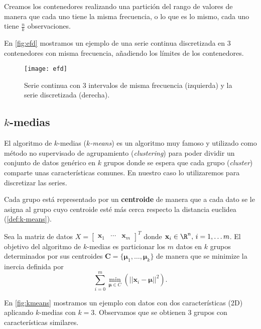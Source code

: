 Creamos los contenedores realizando una partición del rango de valores de manera que cada uno tiene la misma frecuencia, o lo que es lo mismo, cada uno tiene $\frac{n}{k}$ observaciones.

En \autoref{fig:efd} mostramos un ejemplo de una serie continua discretizada en 3 contenedores con misma frecuencia, añadiendo los límites de los contenedores.

\begin{figure}[htpb]
  \centering
  \texttt{[image: efd]}
  \caption{Serie continua con 3 intervalos de misma frecuencia (izquierda) y la serie discretizada (derecha).}
  \label{fig:efd}
\end{figure}

\subsection{$k$-medias}

El algoritmo de $k$-medias (\emph{$k$-means}) \cite{macqueen1967some} es un algoritmo muy famoso y utilizado como método no supervisado de agrupamiento (\emph{clustering}) para poder dividir un conjunto de datos genérico en $k$ grupos donde se espera que cada grupo (\emph{cluster}) comparte unas características comunes. En nuestro caso lo utilizaremos para discretizar las series.

Cada grupo está representado por un \textbf{centroide} de manera que a cada dato se le asigna al grupo cuyo centroide esté más cerca respecto la distancia euclidea (\autoref{def:k-means}).

\begin{definicion}[$k$-medias]
  Sea la matriz de datos $X = \begin{bmatrix} \textbf{x}_1 & \cdots & \textbf{x}_m \end{bmatrix}^T$ donde $\textbf{x}_i \in \R^n, \, i = 1, \ldots m$. El objetivo del algoritmo de $k$-medias es particionar los $m$ datos en $k$ grupos determinados por sus centroides $\textbf{C} = \{\pmb{\mu}_1, \ldots, \pmb{\mu}_k\}$ de manera que se minimize la inercia definida por
  $$\sum \limits^m_{i = 0} \min \limits_{\pmb{\mu} \in C} \left(||\textbf{x}_i - \pmb\mu ||^2 \right).$$
  \label{def:k-means}
\end{definicion}

En \autoref{fig:kmeans} \cite{ruiz2018kmeans} mostramos un ejemplo con datos con dos características (2D) aplicando $k$-medias con $k = 3$. Observamos que se obtienen 3 grupos con características similares.

